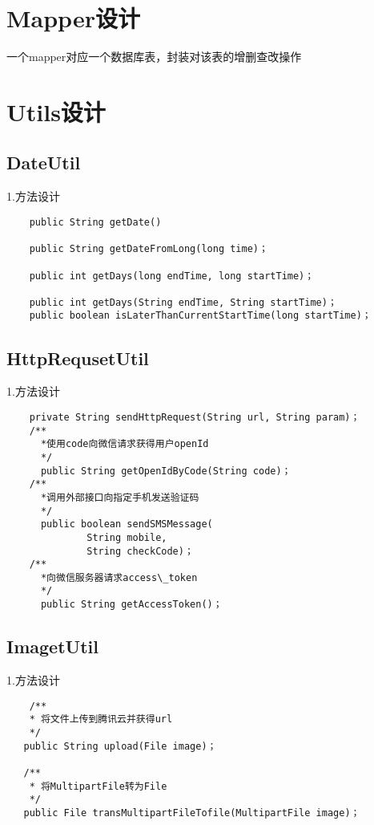 \section{Mapper设计}
一个mapper对应一个数据库表，封装对该表的增删查改操作

\section{Utils设计}

\subsection{DateUtil}
1.方法设计
\begin{lstlisting}
    public String getDate()
    
    public String getDateFromLong(long time)；
    
    public int getDays(long endTime, long startTime)；
    
    public int getDays(String endTime, String startTime)；
    public boolean isLaterThanCurrentStartTime(long startTime)；

\end{lstlisting}

\subsection{HttpRequsetUtil}
1.方法设计
\begin{lstlisting}
    private String sendHttpRequest(String url, String param)；
    /**
      *使用code向微信请求获得用户openId
      */    
      public String getOpenIdByCode(String code)；
    /**
      *调用外部接口向指定手机发送验证码   
      */
      public boolean sendSMSMessage(
              String mobile,
              String checkCode)；
    /**
      *向微信服务器请求access\_token
      */  
      public String getAccessToken()；
\end{lstlisting}

\subsection{ImagetUtil}
1.方法设计
\begin{lstlisting}
    /**
    * 将文件上传到腾讯云并获得url
    */
   public String upload(File image)；
   
   /**
    * 将MultipartFile转为File
    */
   public File transMultipartFileTofile(MultipartFile image)；
\end{lstlisting}

